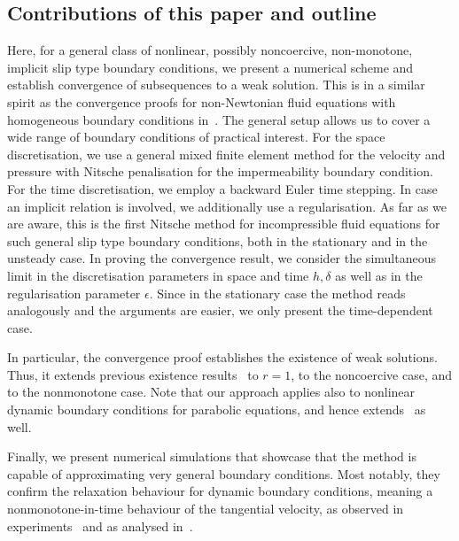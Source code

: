 \documentclass[reqno,a4paper]{amsart}
\begin{document}
	\subsection{Contributions of this paper and outline}		
	Here, for a general class of nonlinear, possibly noncoercive, non-monotone, implicit slip type boundary conditions, we present a numerical scheme and establish convergence of subsequences to a weak solution. 
	This is in a similar spirit as the convergence proofs for non-Newtonian fluid equations with homogeneous boundary conditions in~\cite{SueliTscherpel2020,FarrellGazcaOrozcoSueli2020}. The general setup allows us to cover a wide range of boundary conditions of practical interest. 
	For the space discretisation, we use a general mixed finite element method for the velocity and pressure with Nitsche penalisation for the impermeability boundary condition. 
	For the time discretisation, we employ a backward Euler time stepping. 
	In case an implicit relation is involved, we additionally use a regularisation.  
	As far as we are aware,  this is the first Nitsche method for incompressible fluid equations for such general slip type boundary conditions, both in the stationary and in the unsteady case. 
	In proving the convergence result, we consider the simultaneous limit in the discretisation parameters in space and time $h,\delta$ as well as in the regularisation parameter $\epsilon$. 
	Since in the stationary case the method reads analogously and the arguments are easier, we only present the time-dependent case. 
	
	In particular, the convergence proof establishes the existence of weak solutions. 
	Thus, it extends previous existence results~\cite{BulicekMalek2019,Abbatiello2021, BulicekMalekMaringova2023} to $r = 1$, to the noncoercive case, and to the nonmonotone case. Note that our approach  applies also to nonlinear dynamic boundary conditions for parabolic equations, and hence extends~\cite{Kovacs2017,AltmannZimmer2024} as well. 
 
	Finally, we present numerical simulations that showcase that the method is capable of approximating very general boundary conditions. Most notably, they confirm the relaxation behaviour for dynamic boundary conditions, meaning a nonmonotone-in-time behaviour of the tangential velocity, as observed in experiments~\cite{Hatzikiriakos2012} and as analysed in~\cite{Abbatiello2021}.
	
\end{document}
